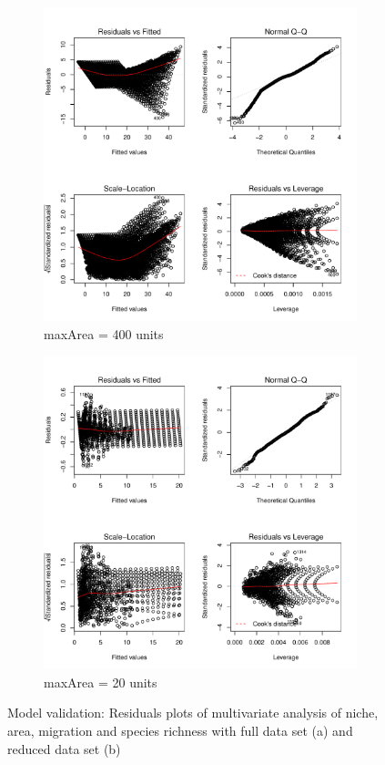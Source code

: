 \documentclass{article}
\begin{document}
\begin{figure}[h!]
  \centering
  \begin{subfigure}[b]{0.4\linewidth}
    \includegraphics[width=\linewidth]{../../../Results/Simulation2/NicheAreaMigrationLmPlot_1.pdf}
    \caption{maxArea = 400 units}
  \end{subfigure}
  \begin{subfigure}[b]{0.4\linewidth}
    \includegraphics[width=\linewidth]{../../../Results/Simulation2/NicheAreaMigrationLmPlot_20.pdf}
    \caption{maxArea = 20 units}
  \end{subfigure}
  \caption{Model validation: Residuals plots of multivariate analysis of niche, area, migration and species richness with full data set (a) and reduced data set (b)}
  \label{fig:Model validation multivariate 1}
\end{figure}
\end{document}
